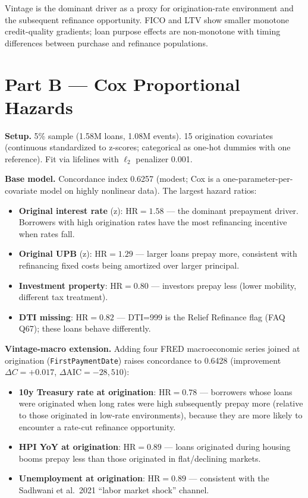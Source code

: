 \documentclass[11pt,a4paper]{article}
\begin{document}
Vintage is the dominant driver as a proxy for origination-rate environment and the subsequent refinance opportunity. FICO and LTV show smaller monotone credit-quality gradients; loan purpose effects are non-monotone with timing differences between purchase and refinance populations.

\section{Part B --- Cox Proportional Hazards}

\textbf{Setup.} 5\% sample (1.58M loans, 1.08M events). 15 origination covariates (continuous standardized to z-scores; categorical as one-hot dummies with one reference). Fit via lifelines with $\ell_2$ penalizer 0.001.

\textbf{Base model.} Concordance index 0.6257 (modest; Cox is a one-parameter-per-covariate model on highly nonlinear data). The largest hazard ratios:
\begin{itemize}[leftmargin=1.2em,itemsep=2pt,topsep=2pt]
  \item \textbf{Original interest rate} (z): $\text{HR} = 1.58$ --- the dominant prepayment driver. Borrowers with high origination rates have the most refinancing incentive when rates fall.
  \item \textbf{Original UPB} (z): $\text{HR} = 1.29$ --- larger loans prepay more, consistent with refinancing fixed costs being amortized over larger principal.
  \item \textbf{Investment property}: $\text{HR} = 0.80$ --- investors prepay less (lower mobility, different tax treatment).
  \item \textbf{DTI missing}: $\text{HR} = 0.82$ --- DTI=999 is the Relief Refinance flag (FAQ Q67); these loans behave differently.
\end{itemize}

\textbf{Vintage-macro extension.} Adding four FRED macroeconomic series joined at origination (\texttt{FirstPaymentDate}) raises concordance to 0.6428 (improvement $\Delta C = +0.017$, $\Delta\text{AIC} = -28{,}510$):
\begin{itemize}[leftmargin=1.2em,itemsep=2pt,topsep=2pt]
  \item \textbf{10y Treasury rate at origination}: $\text{HR} = 0.78$ --- borrowers whose loans were originated when long rates were high subsequently prepay more (relative to those originated in low-rate environments), because they are more likely to encounter a rate-cut refinance opportunity.
  \item \textbf{HPI YoY at origination}: $\text{HR} = 0.89$ --- loans originated during housing booms prepay less than those originated in flat/declining markets.
  \item \textbf{Unemployment at origination}: $\text{HR} = 0.89$ --- consistent with the Sadhwani et al.\ 2021 ``labor market shock'' channel.
\end{itemize}
\end{document}
